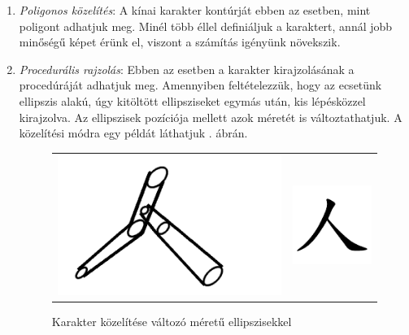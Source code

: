 \begin{enumerate}
\item \textit{Poligonos közelítés}: A kínai karakter kontúrját ebben az esetben, mint poligont adhatjuk meg. Minél több éllel definiáljuk a karaktert, annál jobb minőségű képet érünk el, viszont a számítás igényünk növekszik.
\item \textit{Procedurális rajzolás}: Ebben az esetben a karakter kirajzolásának a procedúráját adhatjuk meg. Amennyiben feltételezzük, hogy az ecsetünk ellipszis alakú, úgy kitöltött ellipsziseket egymás után, kis lépésközzel kirajzolva. Az ellipszisek pozíciója mellett azok méretét is változtathatjuk. A közelítési módra egy példát láthatjuk . ábrán.

\begin{figure}
\centering
\begin{tabular}{ c c }
\includegraphics[scale=0.25]{images/proc_draw1} & \includegraphics[scale=0.5]{images/ren}
\end{tabular}
\caption{Karakter közelítése változó méretű ellipszisekkel}
\label{fig:proc_draw}
\end{figure}


\end{enumerate}
